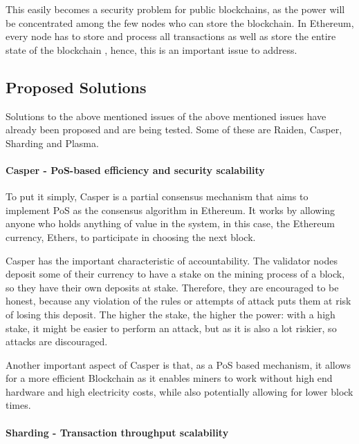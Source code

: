 This easily becomes a security problem for public blockchains, as the power will be concentrated among the few nodes who can store the blockchain. In Ethereum, every node has to store and process all transactions as well as store the entire state of the blockchain \cite{Scherer2017}, hence, this is an important issue to address. 


\subsection{Proposed Solutions}

Solutions to the above mentioned issues of the above mentioned issues have already been proposed and are being tested. Some of these are Raiden, Casper, Sharding and Plasma.


\paragraph{Casper - PoS-based efficiency and security scalability}

To put it simply, Casper is a partial consensus mechanism that aims to implement PoS as the consensus algorithm in Ethereum. It works by allowing anyone who holds anything of value in the system, in this case, the Ethereum currency, Ethers, to participate in choosing the next block.

Casper has the important characteristic of accountability. The validator nodes deposit some of their currency to have a stake on the mining process of a block, so they have their own deposits at stake. Therefore, they are encouraged to be honest, because any violation of the rules or attempts of attack puts them at risk of losing this deposit. The higher the stake, the higher the power: with a high stake, it might be easier to perform an attack, but as it is also a lot riskier, so attacks are discouraged.

Another important aspect of Casper is that, as a PoS based mechanism, it allows for a more efficient Blockchain as it enables miners to work without high end hardware and high electricity costs, while also potentially allowing for lower block times.


\paragraph{Sharding - Transaction throughput scalability}

